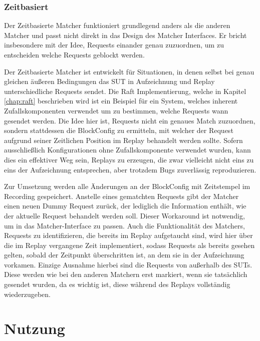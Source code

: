 \documentclass[12pt,a4paper]{report}
\begin{document}
\subsubsection{Zeitbasiert}
Der Zeitbasierte Matcher funktioniert grundlegend anders als die anderen Matcher und passt nicht direkt in das Design des Matcher
Interfaces. Er bricht insbesondere mit der Idee, Requests einander genau zuzuordnen, um zu entscheiden welche Requests geblockt werden.

Der Zeitbasierte Matcher ist entwickelt für Situationen, in denen selbst bei genau gleichen äußeren Bedingungen das SUT in
Aufzeichnung und Replay unterschiedliche Requests sendet. Die Raft Implementierung, welche in Kapitel \ref{chap:raft} beschrieben wird ist ein
Beispiel für ein System, welches inherent Zufallskomponenten verwendet um zu bestimmen, welche Requests wann gesendet werden.
Die Idee hier ist, Requests nicht ein genaues Match zuzuordnen, sondern stattdessen die BlockConfig zu ermitteln, mit welcher der
Request aufgrund seiner Zeitlichen Position im Replay behandelt werden sollte. Sofern ausschließlich Konfigurationen ohne
Zufallskomponente verwendet wurden, kann dies ein effektiver Weg sein, Replays zu erzeugen, die zwar vielleicht nicht eins zu eins der
Aufzeichnung entsprechen, aber trotzdem Bugs zuverlässig reproduzieren.

Zur Umsetzung werden alle Änderungen an der BlockConfig mit Zeitstempel im Recording gespeichert. Anstelle eines gematchten
Requests gibt der Matcher einen neuen Dummy Request zurück, der lediglich die Information enthält, wie der aktuelle Request
behandelt werden soll. Dieser Workaround ist notwendig, um in das Matcher-Interface zu passen. Auch die Funktionalität des
Matchers, Requests zu identifizieren, die bereits im Replay aufgetaucht sind, wird hier über die im Replay vergangene Zeit
implementiert, sodass Requests als bereits gesehen gelten, sobald der Zeitpunkt überschritten ist, an dem sie in der Aufzeichnung
vorkamen. Einzige Ausnahme hierbei sind die Requests von außerhalb des SUTs. Diese werden wie bei den anderen Matchern erst markiert,
wenn sie tatsächlich gesendet wurden, da es wichtig ist, diese während des Replays vollständig wiederzugeben.

\section{Nutzung}
\end{document}
